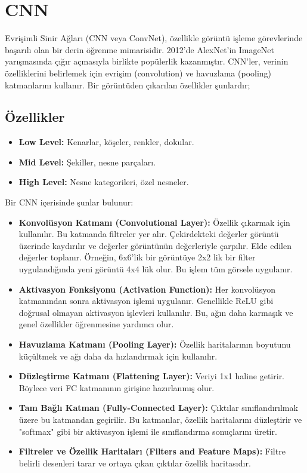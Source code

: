 \section{CNN}
Evrişimli Sinir Ağları (CNN veya ConvNet), özellikle görüntü işleme görevlerinde başarılı olan bir derin öğrenme mimarisidir. 2012'de AlexNet'in ImageNet yarışmasında çığır açmasıyla birlikte popülerlik kazanmıştır. CNN'ler, verinin özelliklerini belirlemek için evrişim (convolution) ve havuzlama (pooling) katmanlarını kullanır. Bir görüntüden çıkarılan özellikler şunlardır;

\subsection{Özellikler}
\begin{itemize}
    \item \textbf{Low Level:} Kenarlar, köşeler, renkler, dokular.
    \item \textbf{Mid Level:} Şekiller, nesne parçaları.
    \item \textbf{High Level:} Nesne kategorileri, özel nesneler.
\end{itemize}

Bir CNN içerisinde şunlar bulunur:

\begin{itemize}
    \item \textbf{Konvolüsyon Katmanı (Convolutional Layer):} Özellik çıkarmak için kullanılır. Bu katmanda filtreler yer alır. Çekirdekteki değerler görüntü üzerinde kaydırılır ve değerler görüntünün değerleriyle çarpılır. Elde edilen değerler toplanır. Örneğin, 6x6’lik bir görüntüye 2x2 lik bir filter uygulandığında yeni görüntü 4x4 lük olur. Bu işlem tüm görsele uygulanır.
    \item \textbf{Aktivasyon Fonksiyonu (Activation Function):} Her konvolüsyon katmanından sonra aktivasyon işlemi uygulanır. Genellikle ReLU gibi doğrusal olmayan aktivasyon işlevleri kullanılır. Bu, ağın daha karmaşık ve genel özellikler öğrenmesine yardımcı olur.
    \item \textbf{Havuzlama Katmanı (Pooling Layer):} Özellik haritalarının boyutunu küçültmek ve ağı daha da hızlandırmak için kullanılır.
    \item \textbf{Düzleştirme Katmanı (Flattening Layer):} Veriyi 1x1 haline getirir. Böylece veri FC katmanının girişine hazırlanmış olur.
    \item \textbf{Tam Bağlı Katman (Fully-Connected Layer):} Çıktılar sınıflandırılmak üzere bu katmandan geçirilir. Bu katmanlar, özellik haritalarını düzleştirir ve "softmax" gibi bir aktivasyon işlemi ile sınıflandırma sonuçlarını üretir.
    \item \textbf{Filtreler ve Özellik Haritaları (Filters and Feature Maps):} Filtre belirli desenleri tarar ve ortaya çıkan çıktılar özellik haritasıdır.
\end{itemize}


